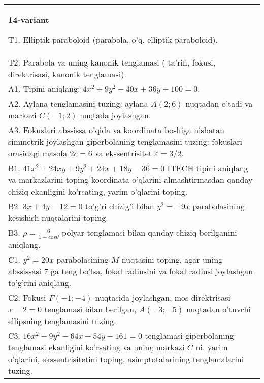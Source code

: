 \documentclass{article}
\begin{document}
\begin{tabular}{m{17cm}}
\textbf{14-variant}
\newline

T1. Elliptik paraboloid (parabola, o'q, elliptik paraboloid).\\

T2. Parabola va uning kanonik tenglamasi ( ta'rifi, fokusi, direktrisasi, kanonik tenglamasi).\\

A1. Tipini aniqlang: $4x^2+9y^2-40x+36y+100=0$.\\

A2. Aylana tenglamasini tuzing: aylana $A(2;6)$ nuqtadan o'tadi va markazi $C(-1;2)$ nuqtada joylashgan.\\

A3. Fokuslari abssissa o'qida va koordinata boshiga nisbatan simmetrik joylashgan giperbolaning tenglamasini tuzing: fokuslari orasidagi masofa $2c=6$ va ekssentrisitet $\varepsilon=3/2$.\\

B1. $41x^{2} + 24xy + 9y^{2} + 24x + 18y - 36 = 0$ ITECH tipini aniqlang va markazlarini toping koordinata o'qlarini almashtirmasdan qanday chiziq ekanligini ko'rsating, yarim o'qlarini toping.  \\

B2. $3x + 4y - 12 = 0$ to'g'ri chizig'i bilan $y^{2} = - 9x$ parabolasining kesishish nuqtalarini toping.  \\

B3. $\rho = \frac{6}{1 - cos\theta}$ polyar tenglamasi bilan qanday chiziq berilganini aniqlang.  \\

C1. $y^{2} = 20x$ parabolasining $M$ nuqtasini toping, agar uning abssissasi 7 ga teng bo'lsa, fokal radiusini va fokal radiusi joylashgan to'g'rini aniqlang.\\

C2. Fokusi $F( - 1; - 4)$ nuqtasida joylashgan, mos direktrisasi $x - 2 = 0$ tenglamasi bilan berilgan, $A( - 3; - 5)$ nuqtadan o'tuvchi ellipsning tenglamasini tuzing.  \\

C3. $16x^{2} - 9y^{2} - 64x - 54y - 161 = 0$ tenglamasi giperbolaning tenglamasi ekanligini ko'rsating va uning markazi $C$ ni, yarim o'qlarini, ekssentrisitetini toping, asimptotalarining tenglamalarini tuzing.  \\

\end{tabular}
\vspace{1cm}
\end{document}
